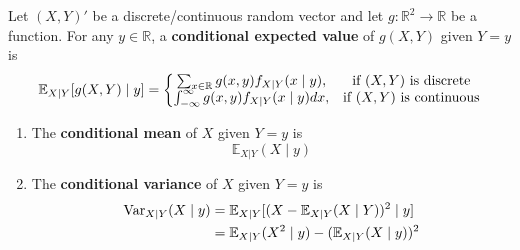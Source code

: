 \documentclass[11pt]{elegantbook}
\begin{document}
\begin{definition}
    \normalfont
    Let $(X,Y)'$ be a discrete/continuous random vector and let $g: \mathbb{R}^2 \rightarrow \mathbb{R}$ be a function. For any $y\in \mathbb{R}$, a \textbf{conditional expected value} of $g(X,Y)$ given $Y=y$ is
    \begin{equation}
        \begin{aligned}
            \mathbb{E}_{X|Y}[g(X,Y)\mid y]=\left\{\begin{matrix}
                \sum_{x\in \mathbb{R}}g(x,y)f_{X|Y}(x\mid y),& \textnormal{if $(X,Y)$ is discrete}\\
                \int_{-\infty}^\infty g(x,y)f_{X|Y}(x\mid y) dx,& \textnormal{if $(X,Y)$ is continuous}
            \end{matrix}\right.
        \end{aligned}
        \nonumber
    \end{equation}
\end{definition}

\begin{definition}
    \normalfont
    \begin{enumerate}[$\circ$]
        \item The \textbf{conditional mean} of $X$ given $Y=y$ is $$\mathbb{E}_{X|Y}(X\mid y)$$
        \item The \textbf{conditional variance} of $X$ given $Y=y$ is
        \begin{equation}
            \begin{aligned}
                \textnormal{Var}_{X|Y}(X\mid y)&=\mathbb{E}_{X|Y}[(X-\mathbb{E}_{X|Y}(X\mid Y))^2\mid y]\\
                &=\mathbb{E}_{X|Y}(X^2\mid y)-(\mathbb{E}_{X|Y}(X\mid y))^2
            \end{aligned}
            \nonumber
        \end{equation}
    \end{enumerate}
\end{definition}
\end{document}
